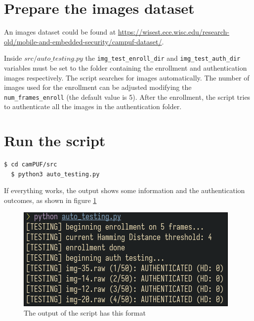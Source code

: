 \section{Prepare the images dataset}\label{sec:preparetheimagedataset}
An images dataset could be found at \url{https://wisest.ece.wisc.edu/research-old/mobile-and-embedded-security/campuf-dataset/}.

Inside $src/auto\_testing.py$ the \texttt{img\_test\_enroll\_dir} and \texttt{img\_test\_auth\_dir} variables must be set to the folder containing the enrollment and authentication images respectively. The script searches for images automatically. The number of images used for the enrollment can be adjusted modifying the \texttt{num\_frames\_enroll} (the default value is 5). After the enrollment, the script tries to authenticate all the images in the authentication folder.

\section{Run the script}\label{sec:runthescript}
\begin{lstlisting}[language=bash]
  $ cd camPUF/src
  $ python3 auto_testing.py
\end{lstlisting}

If everything works, the output shows some information and the authentication outcomes, as shown in figure \ref{fig:resultimg}

\begin{figure}[h!]
	\vspace{0.5cm}
	\includegraphics[width=\textwidth]{images/auto_testing_output.png}
	\caption{The output of the script has this format}
	\label{fig:resultimg}
\end{figure}

